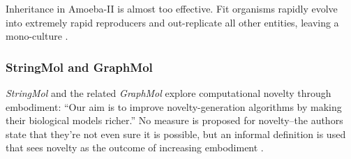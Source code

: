 Inheritance in Amoeba-II is almost too effective. Fit organisms rapidly evolve into extremely rapid reproducers and out-replicate all other entities, leaving a mono-culture \parencite{Pargellis2001}.

%
%
%
%
\subsubsection{StringMol and GraphMol}

\emph{StringMol} \parencite{Hickinbotham2011} and the related \emph{GraphMol} \parencite{Nellis2012, Nellis2014} explore computational novelty through embodiment: ``Our aim is to improve novelty-generation algorithms by making their biological models richer.'' No measure is proposed for novelty--the authors state that they're not even sure it is possible, but an informal definition is used that sees novelty as the outcome of increasing embodiment \parencite[p.87]{Nellis2012}. 

